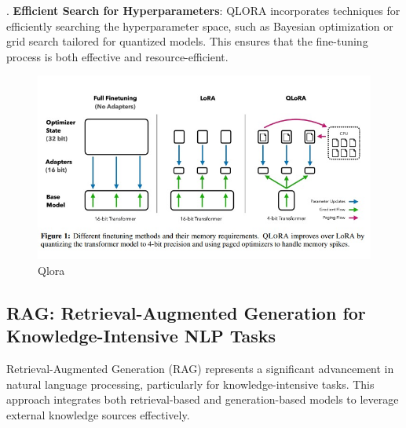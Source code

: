 \hfill {}. \textbf{Efficient Search for Hyperparameters}: QLORA incorporates techniques for efficiently searching the hyperparameter space, such as Bayesian optimization or grid search tailored for quantized models. This ensures that the fine-tuning process is both effective and resource-efficient.

\begin{figure}[h!]
	\centering
	\includegraphics[scale=0.5]{figures/Qlora.jpeg}
	\caption{ Qlora }
\end{figure}
\newpage
\subsection{RAG: Retrieval-Augmented Generation for Knowledge-Intensive NLP Tasks}


Retrieval-Augmented Generation (RAG) represents a significant advancement in natural language processing, particularly for knowledge-intensive tasks. This approach integrates both retrieval-based and generation-based models to leverage external knowledge sources effectively. 

